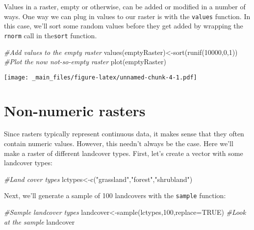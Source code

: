\documentclass[
]{book}
\newenvironment{Shaded}{\begin{snugshade}}{\end{snugshade}}
\newcommand{\AttributeTok}[1]{\textcolor[rgb]{0.77,0.63,0.00}{#1}}
\newcommand{\CommentTok}[1]{\textcolor[rgb]{0.56,0.35,0.01}{\textit{#1}}}
\newcommand{\ConstantTok}[1]{\textcolor[rgb]{0.00,0.00,0.00}{#1}}
\newcommand{\DecValTok}[1]{\textcolor[rgb]{0.00,0.00,0.81}{#1}}
\newcommand{\FunctionTok}[1]{\textcolor[rgb]{0.00,0.00,0.00}{#1}}
\newcommand{\NormalTok}[1]{#1}
\newcommand{\OtherTok}[1]{\textcolor[rgb]{0.56,0.35,0.01}{#1}}
\newcommand{\StringTok}[1]{\textcolor[rgb]{0.31,0.60,0.02}{#1}}
\begin{document}
Values in a raster, empty or otherwise, can be added or modified in a number of ways. One way we can plug in values to our raster is with the \texttt{values} function. In this case, we'll sort some random values before they get added by wrapping the \texttt{rnorm} call in the\texttt{sort} function.

\begin{Shaded}
\begin{Highlighting}[]
\CommentTok{\#Add values to the empty raster}
\FunctionTok{values}\NormalTok{(emptyRaster)}\OtherTok{\textless{}{-}}\FunctionTok{sort}\NormalTok{(}\FunctionTok{runif}\NormalTok{(}\DecValTok{10000}\NormalTok{,}\DecValTok{0}\NormalTok{,}\DecValTok{1}\NormalTok{))}
\CommentTok{\#Plot the now not{-}so{-}empty raster}
\FunctionTok{plot}\NormalTok{(emptyRaster)}
\end{Highlighting}
\end{Shaded}

\texttt{[image: \_main\_files/figure-latex/unnamed-chunk-4-1.pdf]}

\hypertarget{non-numeric-rasters}{%
\section{Non-numeric rasters}\label{non-numeric-rasters}}

Since rasters typically represent continuous data, it makes sense that they often contain numeric values. However, this needn't always be the case. Here we'll make a raster of different landcover types. First, let's create a vector with some landcover types:

\begin{Shaded}
\begin{Highlighting}[]
\CommentTok{\#Land cover types}
\NormalTok{lctypes}\OtherTok{\textless{}{-}}\FunctionTok{c}\NormalTok{(}\StringTok{"grassland"}\NormalTok{,}\StringTok{"forest"}\NormalTok{,}\StringTok{"shrubland"}\NormalTok{)}
\end{Highlighting}
\end{Shaded}

Next, we'll generate a sample of 100 landcovers with the \texttt{sample} function:

\begin{Shaded}
\begin{Highlighting}[]
\CommentTok{\#Sample landcover types}
\NormalTok{landcover}\OtherTok{\textless{}{-}}\FunctionTok{sample}\NormalTok{(lctypes,}\DecValTok{100}\NormalTok{,}\AttributeTok{replace=}\ConstantTok{TRUE}\NormalTok{)}
\CommentTok{\#Look at the sample}
\NormalTok{landcover}
\end{Highlighting}
\end{Shaded}
\end{document}
